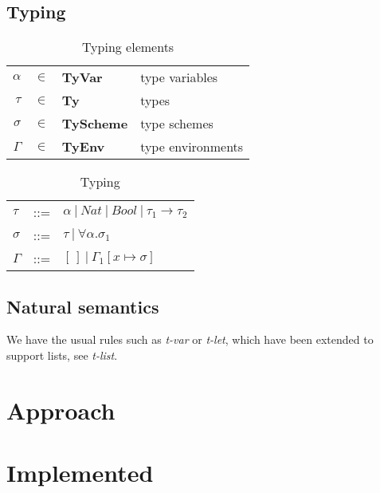 \documentclass[a4paper]{article}
\begin{document}
\subsection{Typing}

\begin{table}
    \centering
    \begin{tabular}{rcll}
        $\alpha$ &      $\in$ & \textbf{TyVar}    & type variables  \\
        $\tau$&         $\in$ & \textbf{Ty}       & types \\
        $\sigma $&      $\in$ & \textbf{TyScheme} & type schemes\\
        $\Gamma$&       $\in$ & \textbf{TyEnv}    & type environments  \\
    \end{tabular}
    \caption{Typing elements}
    \label{tab:typingelems}
\end{table}
\begin{table}
    \centering
    \begin{tabular}{lcl}
        $\tau$   & ::= & $\alpha \:|\: Nat \: | \: Bool \: | \: \tau_1 \rightarrow \tau_2 $ \\ 
        $\sigma$ & ::= & $\tau \:|\: \forall \alpha. \sigma_1 $ \\ 
        $\Gamma$ & ::= & $[\,] \:|\: \Gamma_1[x \mapsto \sigma] $ \\
    \end{tabular}
    \caption{Typing}
    \label{tab:typing}
\end{table}


\subsection{Natural semantics}

We have the usual rules such as \emph{t-var} or \emph{t-let}, which have been extended to support lists, see \emph{t-list}. 




\section{Approach}


\section{Implemented}
\end{document}
